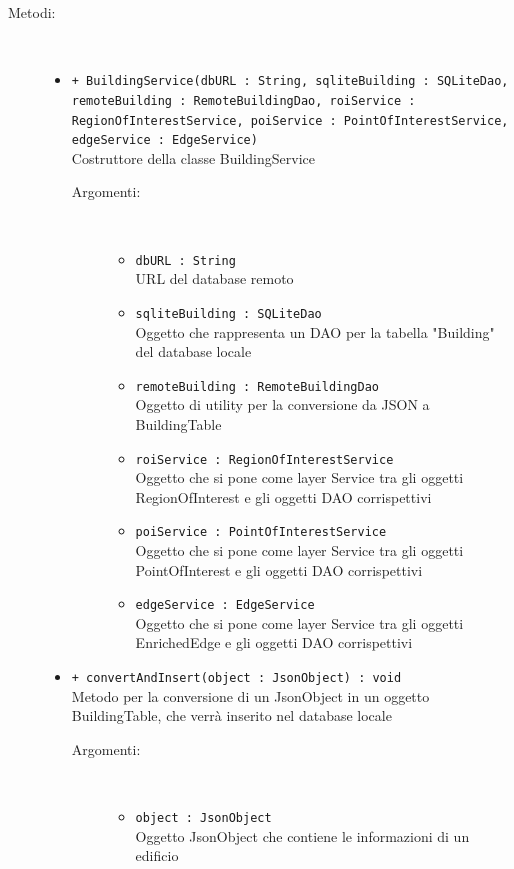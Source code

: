 \documentclass[../DefinizioneDiProdotto.tex]{subfiles}
\begin{document}
\begin{description}
\begin{itemize}
\end{itemize}
\item[Metodi:] \
\begin{itemize}
\item \texttt{+ BuildingService(dbURL : String, sqliteBuilding : SQLiteDao, remoteBuilding : RemoteBuildingDao, roiService : RegionOfInterestService, poiService : PointOfInterestService, edgeService : EdgeService)}\\
Costruttore della classe BuildingService
 \begin{description}
\item[Argomenti:] \
\begin{itemize}
\item \texttt{dbURL : String}\\
URL del database remoto\item \texttt{sqliteBuilding : SQLiteDao}\\
Oggetto che rappresenta un DAO per la tabella "Building" del database locale\item \texttt{remoteBuilding : RemoteBuildingDao}\\
Oggetto di utility per la conversione da JSON a BuildingTable\item \texttt{roiService : RegionOfInterestService}\\
Oggetto che si pone come layer Service tra gli oggetti RegionOfInterest e gli oggetti DAO corrispettivi\item \texttt{poiService : PointOfInterestService}\\
Oggetto che si pone come layer Service tra gli oggetti PointOfInterest e gli oggetti DAO corrispettivi\item \texttt{edgeService : EdgeService}\\
Oggetto che si pone come layer Service tra gli oggetti EnrichedEdge e gli oggetti DAO corrispettivi\end{itemize}
\end{description}
\item \texttt{+ convertAndInsert(object : JsonObject) : void}\\
Metodo per la conversione di un JsonObject in un oggetto BuildingTable, che verrà inserito nel database locale
 \begin{description}
\item[Argomenti:] \
\begin{itemize}
\item \texttt{object : JsonObject}\\
Oggetto JsonObject che contiene le informazioni di un edificio\end{itemize}

\end{description}
\end{itemize}
\end{description}
\end{document}
